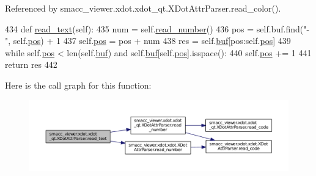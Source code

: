 Referenced by smacc\+\_\+viewer.\+xdot.\+xdot\+\_\+qt.\+X\+Dot\+Attr\+Parser.\+read\+\_\+color().


\begin{DoxyCode}
434     \textcolor{keyword}{def }\hyperlink{classsmacc__viewer_1_1xdot_1_1xdot__qt_1_1XDotAttrParser_a5062632d89dfb47344b1f3eb6e4b8f16}{read\_text}(self):
435         num = self.\hyperlink{classsmacc__viewer_1_1xdot_1_1xdot__qt_1_1XDotAttrParser_a6f88d7537e1f84df6d11f72177c75d21}{read\_number}()
436         pos = self.buf.find(\textcolor{stringliteral}{"-"}, self.\hyperlink{classsmacc__viewer_1_1xdot_1_1xdot__qt_1_1XDotAttrParser_a5a7b9b451f084464b7b49f6c26e18b2a}{pos}) + 1
437         self.\hyperlink{classsmacc__viewer_1_1xdot_1_1xdot__qt_1_1XDotAttrParser_a5a7b9b451f084464b7b49f6c26e18b2a}{pos} = pos + num
438         res = self.\hyperlink{classsmacc__viewer_1_1xdot_1_1xdot__qt_1_1XDotAttrParser_ab491273f15a6ba35e03a8e098ea01076}{buf}[pos:self.\hyperlink{classsmacc__viewer_1_1xdot_1_1xdot__qt_1_1XDotAttrParser_a5a7b9b451f084464b7b49f6c26e18b2a}{pos}]
439         \textcolor{keywordflow}{while} self.\hyperlink{classsmacc__viewer_1_1xdot_1_1xdot__qt_1_1XDotAttrParser_a5a7b9b451f084464b7b49f6c26e18b2a}{pos} < len(self.\hyperlink{classsmacc__viewer_1_1xdot_1_1xdot__qt_1_1XDotAttrParser_ab491273f15a6ba35e03a8e098ea01076}{buf}) \textcolor{keywordflow}{and} self.\hyperlink{classsmacc__viewer_1_1xdot_1_1xdot__qt_1_1XDotAttrParser_ab491273f15a6ba35e03a8e098ea01076}{buf}[self.\hyperlink{classsmacc__viewer_1_1xdot_1_1xdot__qt_1_1XDotAttrParser_a5a7b9b451f084464b7b49f6c26e18b2a}{pos}].isspace():
440             self.\hyperlink{classsmacc__viewer_1_1xdot_1_1xdot__qt_1_1XDotAttrParser_a5a7b9b451f084464b7b49f6c26e18b2a}{pos} += 1
441         \textcolor{keywordflow}{return} res
442 
\end{DoxyCode}


Here is the call graph for this function\+:
\nopagebreak
\begin{figure}[H]
\begin{center}
\leavevmode
\includegraphics[width=350pt]{classsmacc__viewer_1_1xdot_1_1xdot__qt_1_1XDotAttrParser_a5062632d89dfb47344b1f3eb6e4b8f16_cgraph}
\end{center}
\end{figure}




